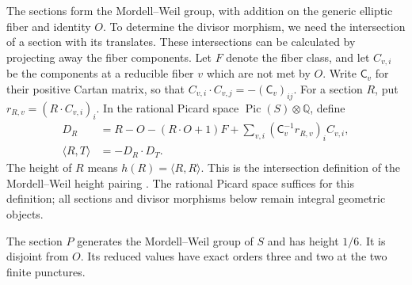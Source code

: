 \documentclass[11pt]{article}
\numberwithin{equation}{section}
\begin{document}
The sections form the Mordell--Weil group, with addition on the
generic elliptic fiber and identity $O$. To determine the divisor
morphism, we need the intersection of a section with its translates.
These intersections can be calculated by projecting away the fiber
components. Let $F$ denote the fiber
class, and let $C_{v,i}$ be the components at a reducible fiber $v$
which are not met by $O$. Write $\mathsf C_v$ for their positive
Cartan matrix, so that
$C_{v,i}\cdot C_{v,j}=-(\mathsf C_v)_{ij}$. For a section $R$,
put $r_{R,v}=(R\cdot C_{v,i})_i$. In the rational Picard space
$\operatorname{Pic}(S)\otimes\mathbb Q$, define
\begin{equation}\label{hol:eq:section-projection}
 \begin{aligned}
 D_R&=R-O-(R\cdot O+1)F
       +\sum_{v,i}(\mathsf C_v^{-1}r_{R,v})_iC_{v,i},\\
 \langle R,T\rangle&=-D_R\cdot D_T.
 \end{aligned}
\end{equation}
The height of $R$ means $h(R)=\langle R,R\rangle$.
This is the intersection definition of the Mordell--Weil height
pairing \cite[\S3, (3.1)]{OguisoShioda}.
The rational Picard space suffices for this definition; all
sections and divisor morphisms below remain integral geometric
objects.

\begin{lemma}\label{hol:lem:section}
The section $P$ generates the Mordell--Weil group of $S$ and has
height $1/6$. It is disjoint from $O$. Its reduced values have exact
orders three and two at the two finite punctures.
\end{lemma}
\end{document}
